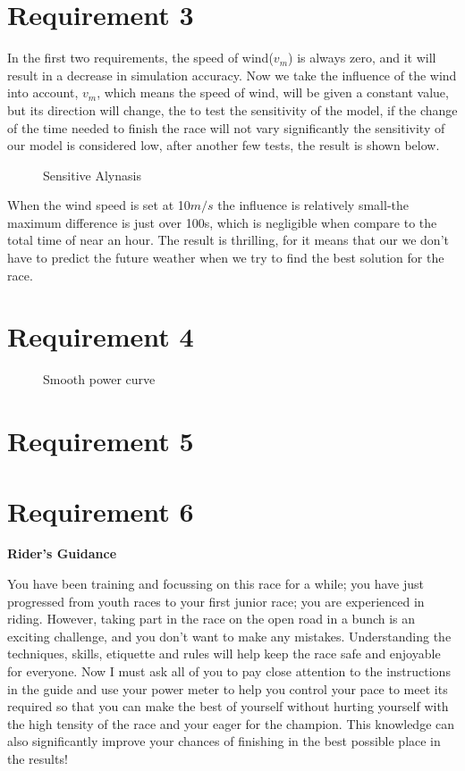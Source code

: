 \documentclass[12pt]{article}
\begin{document}
\section{Requirement 3}
In the first two requirements, the speed of wind($v_m$) is always zero, and it will result in a decrease in simulation accuracy.
Now we take the influence of the wind into account,  $v_m$, which means the speed of wind, will be given a constant value, but its direction will change, the 
to test the sensitivity of the model, if the change of the time needed to finish the race will not vary significantly the sensitivity of our model
is considered low, after another few tests, the result is shown below.
\begin{figure}
    \centering
    
    \caption{Sensitive Alynasis}
\end{figure}
When the wind speed is set at 10$m/s$ the influence is relatively small-the maximum difference is just over 100s, which is negligible when compare to the total time of 
near an hour. The result is thrilling, for it means that our we don't have to predict the future weather when we try to find the best solution for the race.
\section{Requirement 4}
\begin{figure}
    \centering
    
    \caption{Smooth power curve}
\end{figure}
\section{Requirement 5}


\newpage
\section{Requirement 6}
\begin{center}
    \huge \textbf{Rider's Guidance}
\end{center}\large
You have been training and focussing on this race for a while; you  have just progressed from youth races to your first junior race; you are experienced in riding.
However, taking part in the race on the open road in a bunch is an exciting challenge, and you don't want to make any mistakes.
Understanding the techniques, skills, etiquette and rules will help keep the race safe and enjoyable for everyone. Now I must ask all of you to pay close attention to the instructions in the guide and use your power meter
to help you control your pace to meet its required so that you can make the best of yourself without hurting yourself with the high tensity of the race and your eager for
the champion. This knowledge can also significantly improve your chances of finishing in the best possible place in the results!
\end{document}
